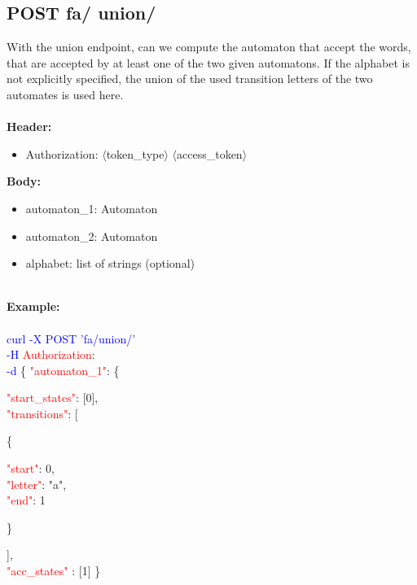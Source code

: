 \subsection{POST fa/ union/}
With the union endpoint, can we compute the automaton that accept the words, that are accepted by at least one of the two given automatons. If the alphabet is not explicitly specified, the union of the used transition letters of the two automates is used here. \\
\ \\
\textbf{Header:}
\begin{itemize}
    \item Authorization: $\langle$token\_type$\rangle$ $\langle$access\_token$\rangle$
\end{itemize}
\textbf{Body:}
\ \\
\begin{itemize}
    \item automaton\_1: Automaton
     \item automaton\_2: Automaton
    \item alphabet: list of strings (optional)
\end{itemize}
\ \\
\textbf{Example:} \\
\ \\
\textcolor{blue}{curl -X POST '\BaseURL fa/union/'\\
-H} \textcolor{red}{Authorization}: \Auth \\
\textcolor{blue}{-d} \{ 
     \textcolor{red}{"automaton\_1"}: \{
     \begin{adjustwidth}{7.5 mm}{0 cm}
     \begin{adjustwidth}{7.5 mm}{0 cm}
            \textcolor{red}{"start\_states"}: [0],\\
            \textcolor{red}{"transitions"}: [
            \begin{adjustwidth}{7.5 mm}{0 cm}
            \{
               \begin{adjustwidth}{7.5 mm}{0 cm}
                    \textcolor{red}{"start"}: 0,\\
                    \textcolor{red}{"letter"}: "a",\\
                    \textcolor{red}{"end"}: 1
               \end{adjustwidth}
            \}
            \end{adjustwidth}
            ],\\
        \textcolor{red}{"acc\_states" }: [1]  \}
    \end{adjustwidth}
    \end{adjustwidth}
